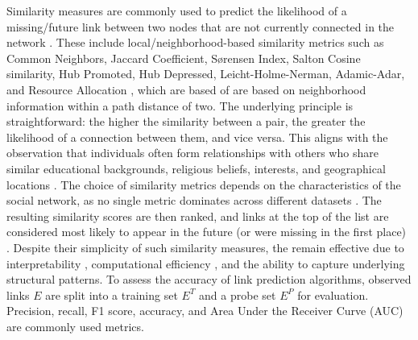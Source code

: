 Similarity measures are commonly used to predict the likelihood of a missing/future link between two nodes that are not currently connected in the network \cite{wang2014link, arrar2023comprehensive}. These include local/neighborhood-based similarity metrics such as Common Neighbors, Jaccard Coefficient,  S{\o}rensen Index, Salton Cosine similarity, Hub Promoted, Hub Depressed, Leicht-Holme-Nerman, Adamic-Adar, and Resource Allocation \cite{arrar2023comprehensive, wang2014link}, which are based of are based on neighborhood information within a path distance of two. The underlying principle is straightforward: the higher the similarity between a pair, the greater the likelihood of a connection between them, and vice versa. This aligns with the observation that individuals often form relationships with others who share similar educational backgrounds, religious beliefs, interests, and geographical locations \cite{wang2014link}. The choice of similarity metrics depends on the characteristics of the social network, as no single metric dominates across different datasets \cite{arrar2023comprehensive, zhou2021progresses}. The resulting similarity scores are then ranked, and links at the top of the list are considered most likely to appear in the future (or were missing in the first place) \cite{wang2014link}. Despite their simplicity of such similarity measures, the remain effective due to interpretability \cite{barbieri2014follow, pai2019netdx}, computational efficiency \cite{garcia2014link}, and the ability to capture underlying structural patterns. To assess the accuracy of link prediction algorithms, observed links $E$ are split into a training set $E^T$ and a probe set $E^P$ for evaluation. Precision, recall, F1 score, accuracy, and Area Under the Receiver Curve (AUC) are commonly used metrics.

